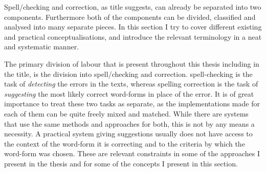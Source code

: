\documentclass[officiallayout,final]{unihelcompling}
\begin{document}
Spell\-/checking and correction, as title suggests, can already be
separated into two components. Furthermore both of the components can be
divided, classified and analysed into many separate pieces. In this section I
try to cover different existing and practical conceptualisations, and introduce
the relevant terminology in a neat and systematic manner.

The primary division of labour that is present throughout this thesis including
in the title, is the division into spell\-/checking and correction.
\Gls{spell-checking} is the task of \emph{detecting} the errors in the texts,
whereas \gls{spelling correction} is the task of \emph{suggesting} the most
likely correct \glspl{word-form} in place of the error. It is of great
importance to treat these two tasks as separate, as the implementations made
for each of them can be quite freely mixed and matched.  While there are
systems that use the same methods and approaches for both, this is not by any
means a necessity. A practical system giving suggestions usually does not have
access to the context of the word-form it is correcting and to the criteria by
which the word-form was chosen. These are relevant constraints in some of the
approaches I present in the thesis and for some of the concepts I present in
this section.
\end{document}
